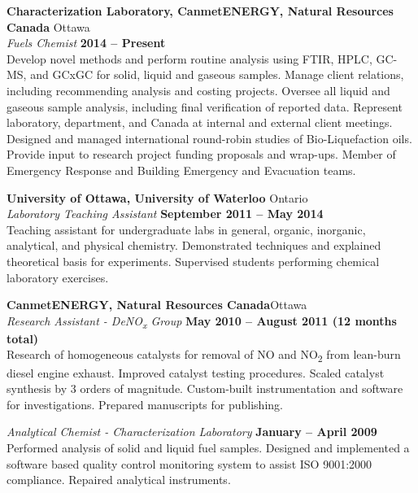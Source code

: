 \documentclass[margin,line]{resumecls}
\begin{document}
\begin{resume}
    \textbf{Characterization Laboratory, CanmetENERGY, Natural Resources Canada} \hfill Ottawa \\\vspace{1mm}%
    \textsl{Fuels Chemist} \hfill \textbf{2014 -- Present}\\
    Develop novel methods and perform routine analysis using FTIR, HPLC, GC-MS, and GCxGC for solid, liquid and gaseous samples.
    Manage client relations, including recommending analysis and costing projects.
    Oversee all liquid and gaseous sample analysis, including final verification of reported data.
    Represent laboratory, department, and Canada at internal and external client meetings.
    Designed and managed international round-robin studies of Bio-Liquefaction oils.
    Provide input to research project funding proposals and wrap-ups.
    Member of Emergency Response and Building Emergency and Evacuation teams.

    \textbf{University of Ottawa, University of Waterloo} \hfill Ontario \\\vspace{1mm}%
    \textsl{Laboratory Teaching Assistant} \hfill \textbf{September 2011 -- May 2014}\\
    Teaching assistant for undergraduate labs in general, organic, inorganic, analytical, and physical chemistry.
    Demonstrated techniques and explained theoretical basis for experiments.
    Supervised students performing chemical laboratory exercises.

    \textbf{CanmetENERGY, Natural Resources Canada}\hfill Ottawa \\\vspace{1mm}%
    \textsl{Research Assistant - DeNO\textsubscript{x} Group} \hfill \textbf{May 2010 -- August 2011 (12 months total)}\\
    Research of homogeneous catalysts for removal of NO and NO\textsubscript{2} from lean-burn diesel engine exhaust.
    Improved catalyst testing procedures.
    Scaled catalyst synthesis by 3 orders of magnitude.
    Custom-built instrumentation and software for investigations.
    Prepared manuscripts for publishing.

    \textsl{Analytical Chemist - Characterization Laboratory} \hfill \textbf{January -- April 2009}\\
    Performed analysis of solid and liquid fuel samples.
    Designed and implemented a software based quality control monitoring system to assist ISO 9001:2000 compliance.
    Repaired analytical instruments.


\end{resume}
\end{document}
